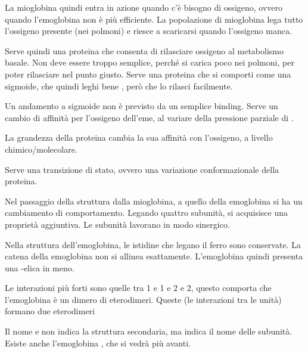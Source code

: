 La mioglobina quindi entra in azione quando c'è bisogno di ossigeno, ovvero quando l'emoglobina non è più efficiente.
La popolazione di mioglobina lega tutto l'ossigeno presente (nei polmoni) e riesce a
scaricarsi quando l'ossigeno manca.

Serve quindi una proteina che consenta di rilasciare ossigeno al metabolismo basale. Non deve essere troppo semplice, perché si carica
poco nei polmoni, per poter rilasciare nel punto giusto. Serve una
proteina che si comporti come una sigmoide, che quindi leghi bene
, però che lo rilasci facilmente.


Un andamento a sigmoide non è previsto da un semplice binding. Serve un
cambio di affinità per l'ossigeno dell'eme, al variare della pressione
parziale di .

La grandezza della proteina cambia la sua affinità con l'ossigeno, a livello chimico/molecolare.

Serve una transizione di stato, ovvero una variazione conformazionale della proteina.

Nel passaggio della struttura dalla mioglobina, a quello della
emoglobina si ha un cambiamento di comportamento. Legando quattro
subunità, si acquisisce una proprietà aggiuntiva. Le subunità lavorano
in modo sinergico.


Nella struttura dell'emoglobina, le istidine che legano il ferro sono conservate. La catena della
emoglobina non si allinea esattamente. L'emoglobina quindi presenta una
\alpha-elica in meno.


Le interazioni più forti sono quelle tra \alpha{}1 e \beta{}1 e \alpha{}2 e \beta{}2, questo
comporta che l'emoglobina è un dimero di eterodimeri. Queste (le
interazioni tra le unità) formano due eterodimeri

Il nome \alpha{} e \beta{} non indica la struttura secondaria, ma indica il
nome delle subunità. Esiste anche l'emoglobina \gamma, che si vedrà più
avanti.

